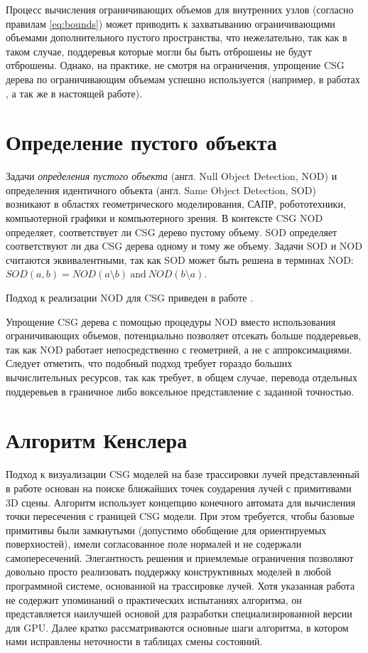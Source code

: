 
Процесс вычисления ограничивающих объемов для внутренних узлов (согласно правилам \ref{eq:bounds}) может приводить к захватыванию ограничивающими объемами дополнительного пустого пространства, что нежелательно, так как в таком случае, поддеревья которые могли бы быть отброшены не будут отброшены. Однако, на практике, не смотря на ограничения, упрощение CSG дерева по ограничивающим объемам успешно используется (например, в работах , а так же в настоящей работе).

\section{Определение пустого объекта} \label{sect_csg_null_object}

Задачи \textit{определения пустого объекта} (англ. Null Object Detection, NOD) и определения идентичного объекта (англ. Same Object Detection, SOD) возникают в областях геометрического моделирования, САПР, робототехники, компьютерной графики и компьютерного зрения. В контексте CSG NOD определяет, соответствует ли CSG дерево пустому объему. SOD определяет соответствуют ли два CSG дерева одному и тому же объему. Задачи SOD и NOD считаются эквивалентными, так как SOD может быть решена в терминах NOD: $SOD(a, b) = NOD(a \setminus b) \ \text{and} \ NOD(b \setminus a)$.

Подход к реализации NOD для CSG приведен в работе .

Упрощение CSG дерева с помощью процедуры NOD вместо использования ограничивающих объемов, потенциально позволяет отсекать больше поддеревьев, так как NOD работает непосредственно с геометрией, а не с аппроксимациями. Следует отметить, что подобный подход требует гораздо больших вычислительных ресурсов, так как требует, в общем случае, перевода отдельных поддеревьев в граничное либо воксельное представление с заданной точностью.

\section{Алгоритм Кенслера} \label{sect2_kensler}

Подход к визуализации CSG моделей на базе трассировки лучей представленный в работе \todo{[8]} основан на поиске ближайших точек соударения лучей с примитивами 3D сцены. Алгоритм использует концепцию конечного автомата для вычисления точки пересечения с границей CSG модели. При этом требуется, чтобы базовые примитивы были замкнутыми (допустимо обобщение для ориентируемых поверхностей), имели согласованное поле нормалей и не содержали самопересечений. Элегантность решения и приемлемые ограничения позволяют довольно просто реализовать поддержку конструктивных моделей в любой программной системе, основанной на трассировке лучей. Хотя указанная работа не содержит упоминаний о практических испытаниях алгоритма, он представляется наилучшей основой для разработки специализированной версии для GPU. Далее кратко рассматриваются основные шаги алгоритма, в котором нами исправлены неточности в таблицах смены состояний.

